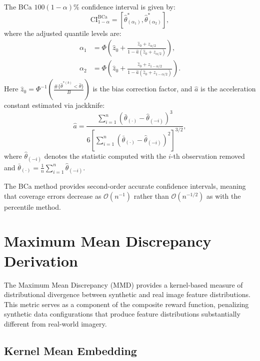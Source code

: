 \begin{theorem}
\label{thm:bca_bootstrap}
The BCa $100(1-\alpha)\%$ confidence interval is given by:
\begin{equation}
\text{CI}_{1-\alpha}^{\text{BCa}} = \left[\hat{\theta}^*_{(\alpha_1)}, \hat{\theta}^*_{(\alpha_2)}\right],
\end{equation}
where the adjusted quantile levels are:
\begin{align}
\alpha_1 &= \Phi\left(\hat{z}_0 + \frac{\hat{z}_0 + z_{\alpha/2}}{1 - \hat{a}(\hat{z}_0 + z_{\alpha/2})}\right), \\
\alpha_2 &= \Phi\left(\hat{z}_0 + \frac{\hat{z}_0 + z_{1-\alpha/2}}{1 - \hat{a}(\hat{z}_0 + z_{1-\alpha/2})}\right).
\end{align}
Here $\hat{z}_0 = \Phi^{-1}\left(\frac{\#\{\hat{\theta}^{*(b)} < \hat{\theta}\}}{B}\right)$ is the bias correction factor, and $\hat{a}$ is the acceleration constant estimated via jackknife:
\begin{equation}
\hat{a} = \frac{\sum_{i=1}^{n} (\bar{\theta}_{(\cdot)} - \hat{\theta}_{(-i)})^3}{6\left[\sum_{i=1}^{n} (\bar{\theta}_{(\cdot)} - \hat{\theta}_{(-i)})^2\right]^{3/2}},
\end{equation}
where $\hat{\theta}_{(-i)}$ denotes the statistic computed with the $i$-th observation removed and $\bar{\theta}_{(\cdot)} = \frac{1}{n} \sum_{i=1}^{n} \hat{\theta}_{(-i)}$.
\end{theorem}

The BCa method provides second-order accurate confidence intervals, meaning that coverage errors decrease as $\mathcal{O}(n^{-1})$ rather than $\mathcal{O}(n^{-1/2})$ as with the percentile method.

\section{Maximum Mean Discrepancy Derivation}
\label{sec:mmd_derivation}

The Maximum Mean Discrepancy (MMD) provides a kernel-based measure of distributional divergence between synthetic and real image feature distributions. This metric serves as a component of the composite reward function, penalizing synthetic data configurations that produce feature distributions substantially different from real-world imagery.

\subsection{Kernel Mean Embedding}

